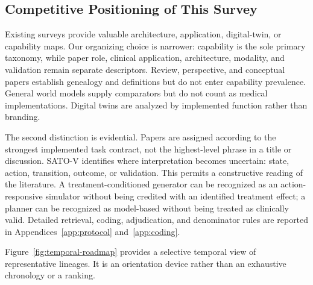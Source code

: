 \subsection{Competitive Positioning of This Survey}

Existing surveys provide valuable architecture, application, digital-twin, or capability maps. Our organizing choice is narrower: capability is the sole primary taxonomy, while paper role, clinical application, architecture, modality, and validation remain separate descriptors. Review, perspective, and conceptual papers establish genealogy and definitions but do not enter capability prevalence. General world models supply comparators but do not count as medical implementations. Digital twins are analyzed by implemented function rather than branding.

The second distinction is evidential. Papers are assigned according to the strongest implemented task contract, not the highest-level phrase in a title or discussion. SATO-V identifies where interpretation becomes uncertain: state, action, transition, outcome, or validation. This permits a constructive reading of the literature. A treatment-conditioned generator can be recognized as an action-responsive simulator without being credited with an identified treatment effect; a planner can be recognized as model-based without being treated as clinically valid. Detailed retrieval, coding, adjudication, and denominator rules are reported in Appendices~\ref{app:protocol} and~\ref{app:coding}.

Figure~\ref{fig:temporal-roadmap} provides a selective temporal view of representative lineages. It is an orientation device rather than an exhaustive chronology or a ranking.


